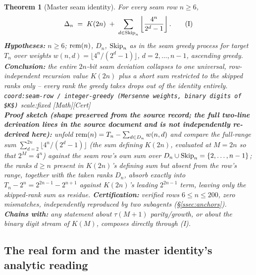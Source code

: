\documentclass[11pt]{article}
\theoremstyle{plain}
\newtheorem{thm}{Theorem}[section]
\theoremstyle{definition}
\theoremstyle{remark}
\let\origmathrm\mathrm
\renewcommand{\mathrm}[1]{\ifmmode\origmathrm{#1}\else\textrm{#1}\fi}%
\newcommand{\ev}[1]{{\small\textsf{[#1]}}\xspace}
\newcommand{\scale}[1]{{\small\textsf{scale:#1}}\xspace}
\newcommand{\coord}[1]{\texorpdfstring{{\small\nolinkurl{coord:#1}}}{coord:#1}\xspace}
\begin{document}
\begin{thm}[Master seam identity]
\label{thm:master-identity}
For every seam row $n \ge 6$,
\begin{equation*}
\Delta_n \;=\; K(2n) \;+\; \sum_{d \in \mathrm{Skip}_n} \left\lfloor \frac{4^n}{2^d-1} \right\rfloor.
\tag{I}
\end{equation*}
\textbf{Hypotheses:} $n \ge 6$; $\mathrm{rem}(n)$, $D_n$, $\mathrm{Skip}_n$ as in the seam greedy
process for target $T_n$ over weights $w(n,d) = \lfloor 4^n/(2^d-1) \rfloor$, $d=2,\dots,n-1$,
ascending greedy. \textbf{Conclusion:} the entire $2n$-bit seam deviation collapses to one universal,
row-independent recursion value $K(2n)$ plus a short sum restricted to the skipped ranks only --
every rank the greedy \emph{takes} drops out of the identity entirely.
\coord{seam-row / integer-greedy (Mersenne weights, binary digits of $K$)} \scale{fixed} \ev{Math}\ev{Cert}\\
\textbf{Proof sketch (shape preserved from the source record; the full two-line derivation lives in
the source document and is not independently re-derived here):} unfold
$\mathrm{rem}(n) = T_n - \sum_{d \in D_n} w(n,d)$ and compare the full-range sum
$\sum_{d=2}^{2n} \lfloor 4^n/(2^d-1)\rfloor$ (the sum defining $K(2n)$, evaluated at $M=2n$ so that
$2^M = 4^n$) against the seam row's own sum over $D_n \cup \mathrm{Skip}_n = \{2,\dots,n-1\}$; the
ranks $d \ge n$ present in $K(2n)$'s defining sum but absent from the row's range, together with the
taken ranks $D_n$, absorb exactly into $T_n - 2^n = 2^{2n-1}-2^{n+1}$ against $K(2n)$'s leading
$2^{2n-1}$ term, leaving only the skipped-rank sum as residue. \textbf{Certification:} verified rows
$6\le n\le200$, zero mismatches, independently reproduced by two subagents (\S\ref{ssec:anchors}).\\
\textbf{Chains with:} any statement about $\tau(M+1)$ parity/growth, or about the binary digit stream
of $K(M)$, composes directly through (I).
\end{thm}

\subsection{The real form and the master identity's analytic reading}
\end{document}
